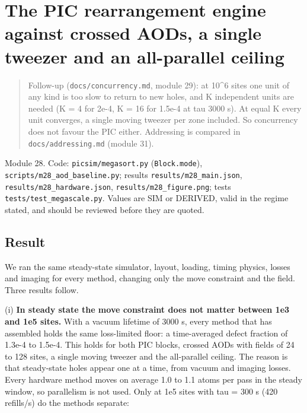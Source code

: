 \hypertarget{the-pic-rearrangement-engine-against-crossed-aods-a-single-tweezer-and-an-all-parallel-ceiling}{%
\chapter{The PIC rearrangement engine against crossed AODs, a single
tweezer and an all-parallel
ceiling}\label{aod_comparison-the-pic-rearrangement-engine-against-crossed-aods-a-single-tweezer-and-an-all-parallel-ceiling}}

\begin{quote}
Follow-up (\texttt{docs/concurrency.md}, module 29): at 10\^{}6 sites
one unit of any kind is too slow to return to new holes, and K
independent units are needed (K = 4 for 2e-4, K = 16 for 1.5e-4 at tau
3000 s). At equal K every unit converges, a single moving tweezer per
zone included. So concurrency does not favour the PIC either. Addressing
is compared in \texttt{docs/addressing.md} (module 31).
\end{quote}

Module 28. Code: \texttt{picsim/megasort.py} (\texttt{Block.mode}),
\texttt{scripts/m28\_aod\_baseline.py}; results
\texttt{results/m28\_main.json}, \texttt{results/m28\_hardware.json},
\texttt{results/m28\_figure.png}; tests
\texttt{tests/test\_megascale.py}. Values are SIM or DERIVED, valid in
the regime stated, and should be reviewed before they are quoted.

\hypertarget{1-result}{%
\section{Result}\label{aod_comparison-1-result}}

We ran the same steady-state simulator, layout, loading, timing physics,
losses and imaging for every method, changing only the move constraint
and the field. Three results follow.

(i) \textbf{In steady state the move constraint does not matter between
1e3 and 1e5 sites.} With a vacuum lifetime of 3000 s, every method that
has assembled holds the same loss-limited floor: a time-averaged defect
fraction of 1.3e-4 to 1.5e-4. This holds for both PIC blocks, crossed
AODs with fields of 24 to 128 sites, a single moving tweezer and the
all-parallel ceiling. The reason is that steady-state holes appear one
at a time, from vacuum and imaging losses. Every hardware method moves
on average 1.0 to 1.1 atoms per pass in the steady window, so
parallelism is not used. Only at 1e5 sites with tau = 300 s (420
refills/s) do the methods separate:

